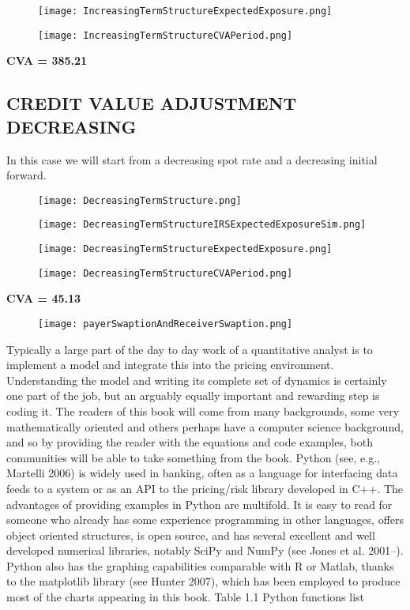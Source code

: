 \documentclass[11pt]{article}
\numberwithin{equation}{subsection}
\begin{document}
\begin{figure}[H]
	\texttt{[image: IncreasingTermStructureExpectedExposure.png]}
\end{figure}
\begin{figure}[H]
	\texttt{[image: IncreasingTermStructureCVAPeriod.png]}
\end{figure}

\textbf{CVA = 385.21}

\subsection{CREDIT VALUE ADJUSTMENT DECREASING}
In this case we will start from a decreasing spot rate and a decreasing initial forward.


\begin{figure}[H]
	\texttt{[image: DecreasingTermStructure.png]}
\end{figure}

\begin{figure}[H]
	\texttt{[image: DecreasingTermStructureIRSExpectedExposureSim.png]}
\end{figure}


\begin{figure}[H]
	\texttt{[image: DecreasingTermStructureExpectedExposure.png]}
\end{figure}

\begin{figure}[H]
	\texttt{[image: DecreasingTermStructureCVAPeriod.png]}
\end{figure}
\textbf{CVA = 45.13}


\begin{figure}[H]
	\texttt{[image: payerSwaptionAndReceiverSwaption.png]}
\end{figure}


\newpage
Typically a large part of the day to day work of a quantitative analyst is to implement a model and integrate this into the pricing environment. Understanding the model and writing its complete set of dynamics is certainly one part of the job, but an arguably equally important and rewarding step is coding it. The readers of this book will come from many backgrounds, some very mathematically oriented and others perhaps have a computer science background, and so by providing the reader with the equations and code examples, both communities will be able to take something from the book. Python (see, e.g., Martelli 2006) is widely used in banking, often as a language for interfacing data feeds to a system or as an API to the pricing/risk library developed in C++. The advantages of providing examples in Python are multifold. It is easy to read for someone who already has some experience programming in other languages, offers object oriented structures, is open source, and has several excellent and well developed numerical libraries, notably SciPy and NumPy (see Jones et al. 2001–). Python also has the graphing capabilities comparable with R or Matlab, thanks to the matplotlib library (see Hunter 2007), which has been employed to produce most of the charts appearing in this book. Table 1.1   Python functions list
\end{document}
